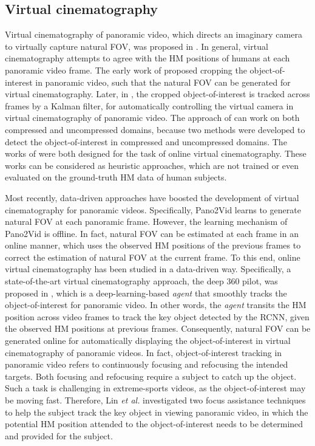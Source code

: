 \documentclass[10pt,journal,compsoc]{IEEEtran}
\begin{document}
\subsection{Virtual cinematography}
Virtual cinematography of panoramic video, which directs an imaginary camera to virtually capture natural FOV, was proposed in \cite{foote2000flycam, sun2005region, su2016pano2vid, hu2017deep, lin2017tell}. In general, virtual cinematography attempts to agree with the HM positions of humans at each panoramic video frame. The early work of \cite{foote2000flycam} proposed cropping the object-of-interest in panoramic video, such that the natural FOV can be generated for virtual cinematography. Later, in \cite{sun2005region}, the cropped object-of-interest is tracked across frames by a Kalman filter, for automatically controlling the virtual camera in virtual cinematography of panoramic video. The approach of \cite{sun2005region} can work on both compressed and uncompressed domains, because two methods were developed to detect the object-of-interest in compressed and uncompressed domains. The works of \cite{foote2000flycam, sun2005region} were both designed for the task of online virtual cinematography. These works can be considered as heuristic approaches, which are not trained or even evaluated on the ground-truth HM data of human subjects.

Most recently, data-driven approaches have boosted the development of virtual cinematography for panoramic videos. Specifically, Pano2Vid \cite{su2016pano2vid} learns to generate natural FOV at each panoramic frame. However, the learning mechanism of Pano2Vid is offline. In fact, natural FOV can be estimated at each frame in an online manner, which uses the observed HM positions of the previous frames to correct the estimation of natural FOV at the current frame. To this end, online virtual cinematography \cite{hu2017deep, lin2017tell} has been studied in a data-driven way.
Specifically, a state-of-the-art virtual cinematography  approach, the deep 360 pilot,  was proposed in \cite{hu2017deep}, which is a deep-learning-based \textit{agent} that smoothly tracks the object-of-interest for panoramic video. In other words, the \textit{agent} transits the HM position across video frames to track the key object detected by the RCNN, given the observed HM positions at previous frames. Consequently, natural FOV can be generated online for automatically displaying the object-of-interest in virtual cinematography of panoramic videos. In fact, object-of-interest tracking in panoramic video refers to continuously focusing and refocusing the intended targets. Both focusing and refocusing require a subject to catch up the object. Such a task is challenging in extreme-sports videos, as the object-of-interest may be moving fast. Therefore, Lin \textit{et al.} \cite{lin2017tell} investigated two focus assistance techniques to help the subject track the key object in viewing panoramic video, in which the potential HM position attended to the object-of-interest needs to be determined and provided for the subject.
\end{document}
